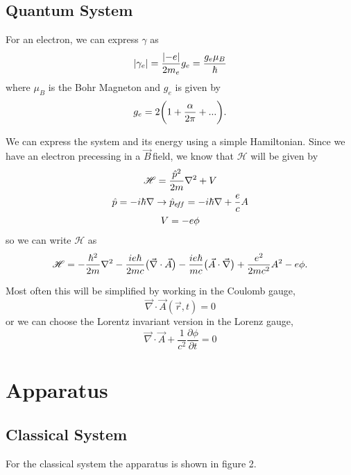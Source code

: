 \documentclass{article}
\newcommand{\diverg}[1]{\ensuremath{\vec{\nabla} \cdot {#1}}}
\newcommand{\B}{$\vec{B}\,$}
\DeclarePairedDelimiter\abs{\lvert}{\rvert}%
\begin{document}
	\subsection{Quantum System}
	For an electron, we can express $\gamma$ as
	\begin{equation}
		\abs{\gamma_e} = \frac{\abs{-e}}{2m_e}g_e = \frac{g_e \mu_B}{\hbar}
	\end{equation}
	where $\mu_B$ is the Bohr Magneton and $g_e$ is given by
	\begin{equation*}
		g_e = 2\bigg{(}1+\frac{\alpha}{2\pi} + ...\bigg{)}.
	\end{equation*}

	We can express the system and its energy using a simple Hamiltonian.  Since we have an electron precessing in a \B field, we know that $\mathscr{H}$ will be given by
	\begin{gather*}
		\mathscr{H} = \frac{\hat{p}^2}{2m} \nabla^2 + V\\
		\hat{p} = -i\hbar \nabla \rightarrow \hat{p}_{\tiny{e\!f\!f}} = -i\hbar \nabla + \frac{e}{c}A\\
		V = -e\phi\\
	\end{gather*}
	so we can write $\mathscr{H}$ as
	\begin{equation}
		\mathscr{H} = -\frac{\hbar^2}{2m} \nabla^2 -\frac{ie\hbar}{2mc} \big{(}\vec{\nabla}\cdot\vec{A}\big{)} - \frac{ie\hbar}{mc}\big{(}\vec{A}\cdot\vec{\nabla}\big{)} + \frac{e^2}{2mc^2}A^2 - e\phi.
	\end{equation}

	Most often this will be simplified by working in the Coulomb gauge, 
	\begin{equation*}
		\diverg{\vec{A}(\vec{r},t)} = 0
	\end{equation*}
	or we can choose the Lorentz invariant version in the Lorenz gauge,
	\begin{equation*}
		\diverg{\vec{A}} + \frac{1}{c^2}\frac{\partial \phi}{\partial t} = 0
	\end{equation*}



\section{Apparatus}
	\subsection{Classical System}
	For the classical system the apparatus is shown in figure 2.
\end{document}
